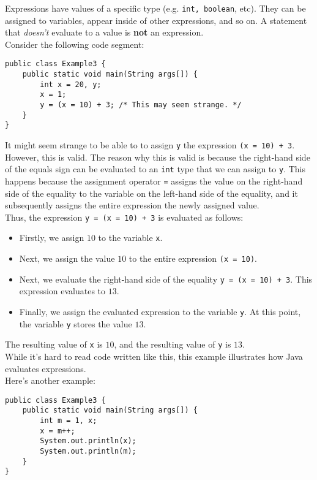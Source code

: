 Expressions have values of a specific type (e.g. \verb!int, boolean!, etc). They can be assigned to variables, appear inside of other expressions, and so on. A statement that \textit{doesn't} evaluate to a value is \textbf{not} an expression. \\


Consider the following code segment:

\begin{lstlisting}
public class Example3 {
    public static void main(String args[]) {
        int x = 20, y;
        x = 1;
        y = (x = 10) + 3; /* This may seem strange. */
    }
}
\end{lstlisting}

It might seem strange to be able to to assign \verb!y! the expression \verb!(x = 10) + 3!. However, this is valid. The reason why this is valid is because the right-hand side of the equals sign can be evaluated to an \verb!int! type that we can assign to \verb!y!. This happens because the assignment operator \verb!=! assigns the value on the right-hand side of the equality to the variable on the left-hand side of the equality, and it subsequently assigns the entire expression the newly assigned value. \\

Thus, the expression \verb!y = (x = 10) + 3! is evaluated as follows:

\begin{itemize}
    \item Firstly, we assign $10$ to the variable \verb!x!. 
    \item Next, we assign the value $10$ to the entire expression \verb!(x = 10)!.
    \item Next, we evaluate the right-hand side of the equality \verb!y = (x = 10) + 3!. This expression evaluates to $13$. 
    \item Finally, we assign the evaluated expression to the variable \verb!y!. At this point, the variable \verb!y! stores the value $13$. 
\end{itemize}

The resulting value of \verb!x! is $10$, and the resulting value of \verb!y! is $13$. \\


While it's hard to read code written like this, this example illustrates how Java evaluates expressions. \\

Here's another example:

\begin{lstlisting}
public class Example3 {
    public static void main(String args[]) {
        int m = 1, x;
        x = m++;
        System.out.println(x);
        System.out.println(m);
    }
}
\end{lstlisting}

